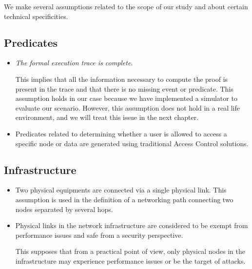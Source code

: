 We make several assumptions related to the scope of our study and about certain technical specificities.

\subsection{Predicates}

\begin{itemize}
    \item \textsl{The formal execution trace is complete}.
    
    This implies that all the information necessary to compute the proof is present in the trace and that there is no missing event or predicate.
This assumption holds in our case because we have implemented a simulator to evaluate our scenario. However, this assumption does not hold in a real life environment, and we will treat this issue in the next chapter.

    \item Predicates related to determining whether a user is allowed to access a specific node or data are generated using traditional Access Control solutions.
    
\end{itemize}


\subsection{Infrastructure}
\begin{itemize}

    \item Two physical equipments are connected via a single physical link. This assumption is used in the definition of a networking path connecting two nodes separated by several hops.

    \item Physical links in the network infrastructure are considered to be exempt from performance issues and safe from a security perspective.
    
    This supposes that from a practical point of view, only physical nodes in the infrastructure may experience performance issues or be the target of attacks.
\end{itemize}

